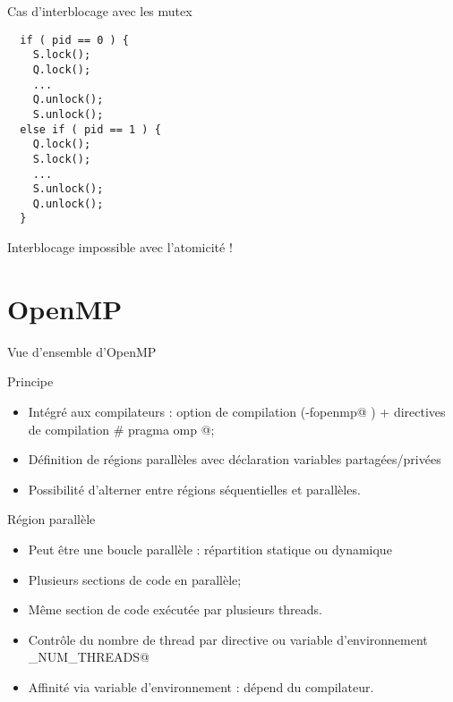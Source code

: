 \documentclass[handout,francais]{beamer}
\begin{document}
\begin{frame}[fragile]{Cas d'interblocage avec les mutex}
 
 \begin{lstlisting}
  if ( pid == 0 ) {
    S.lock();
    Q.lock();
    ...
    Q.unlock();
    S.unlock();
  else if ( pid == 1 ) {
    Q.lock();
    S.lock();
    ...
    S.unlock();
    Q.unlock();
  }
 \end{lstlisting}

 Interblocage impossible avec l'atomicité !
 
\end{frame}

\section{OpenMP}

\begin{frame}[fragile]{Vue d'ensemble d'OpenMP}
 
 \begin{block}{Principe}
  \begin{itemize}
   \item Intégré aux compilateurs : option de compilation (\verb@-fopenmp@ ) + directives de compilation
   \lstinline@# pragma omp @;
   \item Définition de régions parallèles avec déclaration variables partagées/privées
   \item Possibilité d'alterner entre régions séquentielles et parallèles.
  \end{itemize}
 \end{block}
 
 \begin{block}{Région parallèle}
  \begin{itemize}
   \item Peut être une boucle parallèle : répartition statique ou dynamique
   \item Plusieurs sections de code en parallèle;
   \item Même section de code exécutée par plusieurs threads.
   \item Contrôle du nombre de thread par directive ou variable d'environnement
   \verb@OMP_NUM_THREADS@
   \item Affinité via variable d'environnement : dépend du compilateur.
  \end{itemize}
 \end{block}
\end{frame}
\end{document}
